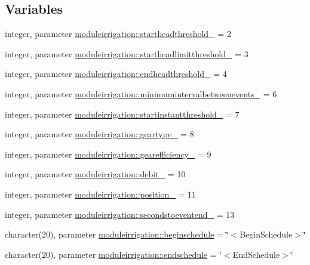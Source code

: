 \subsection*{Variables}
\begin{DoxyCompactItemize}
\item 
integer, parameter \mbox{\hyperlink{namespacemoduleirrigation_a3b553457a1005642e2ac59eb843de92a}{moduleirrigation\+::startheadthreshold\+\_\+}} = 2
\item 
integer, parameter \mbox{\hyperlink{namespacemoduleirrigation_a43d8aa216adc2cd9b9db5c2aa1f90348}{moduleirrigation\+::startheadlimitthreshold\+\_\+}} = 3
\item 
integer, parameter \mbox{\hyperlink{namespacemoduleirrigation_ab4cd763a1789ba18e00c7dae6547325f}{moduleirrigation\+::endheadthreshold\+\_\+}} = 4
\item 
integer, parameter \mbox{\hyperlink{namespacemoduleirrigation_a7c52a4d567422946329e7dffa6698cd7}{moduleirrigation\+::minimumintervalbetweenevents\+\_\+}} = 6
\item 
integer, parameter \mbox{\hyperlink{namespacemoduleirrigation_ae5b31d672d8c4384b45e3ae223caf4c5}{moduleirrigation\+::startinstantthreshold\+\_\+}} = 7
\item 
integer, parameter \mbox{\hyperlink{namespacemoduleirrigation_a1ad7dafe571fb7b8c766b6d5c9c91731}{moduleirrigation\+::geartype\+\_\+}} = 8
\item 
integer, parameter \mbox{\hyperlink{namespacemoduleirrigation_ab50ffa53613e9117da8236fe72ef8e20}{moduleirrigation\+::gearefficiency\+\_\+}} = 9
\item 
integer, parameter \mbox{\hyperlink{namespacemoduleirrigation_a469ab4816f9930b188249666036ab2c0}{moduleirrigation\+::debit\+\_\+}} = 10
\item 
integer, parameter \mbox{\hyperlink{namespacemoduleirrigation_a4715bb03155d7869bc30822df5a48104}{moduleirrigation\+::position\+\_\+}} = 11
\item 
integer, parameter \mbox{\hyperlink{namespacemoduleirrigation_a7554b7e361ce512902bddcb3bc6f8f11}{moduleirrigation\+::secondstoeventend\+\_\+}} = 13
\item 
character(20), parameter \mbox{\hyperlink{namespacemoduleirrigation_a308de16d1c9334b19953d80706843c0f}{moduleirrigation\+::beginschedule}} = \char`\"{}$<$Begin\+Schedule$>$\char`\"{}
\item 
character(20), parameter \mbox{\hyperlink{namespacemoduleirrigation_a60900c938a0d92ac18e3459bf54ee951}{moduleirrigation\+::endschedule}} = \char`\"{}$<$End\+Schedule$>$\char`\"{}

\end{DoxyCompactItemize}
